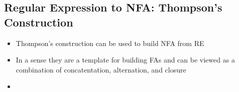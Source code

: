 \documentclass[20pt]{article}
\begin{document}
            \subsection*{Regular Expression to NFA: Thompson's Construction}
                        \begin{itemize}
                            \item Thompson's construction can be used to build NFA from RE
                            \item In a sense they are a template for building FAs and can be viewed as a combination of concatentation, alternation, and closure
                            \item 
                        \end{itemize}
                        
                     

            
\end{document}
